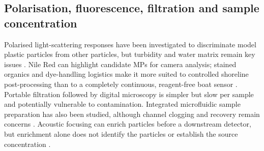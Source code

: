\documentclass[10pt,a4paper]{article}
\begin{document}
\subsection{Polarisation, fluorescence, filtration and sample concentration}
Polarised light-scattering responses have been investigated to discriminate model plastic particles from other particles, but turbidity and water matrix remain key issues \cite{Polarized2021}. Nile Red can highlight candidate MPs for camera analysis; stained organics and dye-handling logistics make it more suited to controlled shoreline post-processing than to a completely continuous, reagent-free boat sensor \cite{ErniCassola2017,Minor2023}. Portable filtration followed by digital microscopy is simpler but slow per sample and potentially vulnerable to contamination. Integrated microfluidic sample preparation has also been studied, although channel clogging and recovery remain concerns \cite{Zhang2023}. Acoustic focusing can enrich particles before a downstream detector, but enrichment alone does not identify the particles or establish the source concentration \cite{Ohori2025}.
\end{document}
